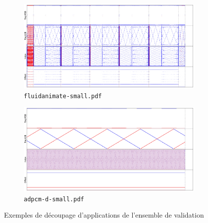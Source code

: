 \begin{figure}
	\begin{subfigure}[t]{\linewidth}
		\centering
		\includegraphics[width=\linewidth]{graphics/figures/src/fluidanimate-small.pdf}
		\caption{\label{fig:fluidanimate-small}\texttt{fluidanimate-small.pdf}}
	\end{subfigure}
	\begin{subfigure}[t]{\linewidth}
		\centering
		\includegraphics[width=\linewidth]{graphics/figures/adpcm-d-large.pdf}
		\caption{\label{fig:adpcm}\texttt{adpcm-d-small.pdf}}
	\end{subfigure}
	\caption{\label{fig:nb-phases}Exemples de découpage d'applications de l'ensemble de validation}
\end{figure}

